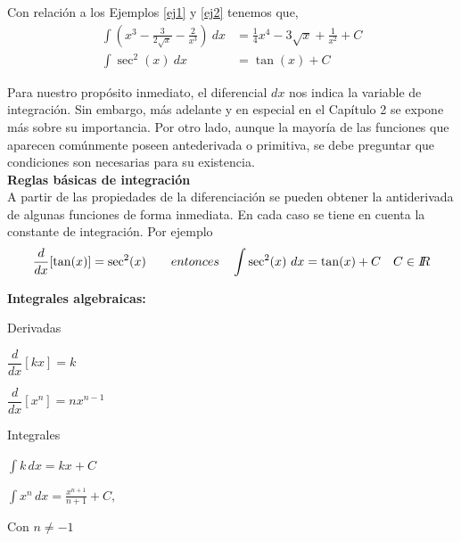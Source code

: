 \begin{Ejemplo} Con relaci\'on a los Ejemplos \ref{ej1} y \ref{ej2} tenemos que, 
\begin{align*}  
  \displaystyle\int \left( x^3-\frac{3}{2\sqrt{x}}-\frac{2}{x^3} \right) \ dx &= \frac{1}{4} x^{4}-3\sqrt{x}+\frac{1}{x^2} + C \\
   \displaystyle\int \sec^{2}(x) \ dx &= \tan(x)+C
\end{align*} 
\end{Ejemplo}

Para nuestro prop\'osito inmediato, el diferencial $dx$ nos indica la variable de integraci\'on. Sin embargo, m\'as adelante y en especial en el Cap\'itulo 2 se expone m\'as sobre su importancia. Por otro lado, aunque la mayor\'ia de las funciones que aparecen com\'unmente poseen antederivada o primitiva, se debe preguntar que condiciones son necesarias para su existencia.  \\


\noindent \textcolor{red!50!black}{\LARGE \bf  Reglas b\'asicas de integraci\'on}   \vspace*{10pt} \\
\noindent
A partir de las propiedades de la diferenciaci\'on se pueden obtener la antiderivada de algunas funciones de forma inmediata. En cada caso se tiene en cuenta la constante de integraci\'on. Por ejemplo
\begin{align*}
\frac{d}{dx}[\tan (x)]=\sec^{2}(x) \qquad entonces \quad \int \sec^{2}(x) \  dx= \tan (x) +C  \quad C\in I\!\! R
\end{align*}


\textbf{Integrales algebraicas:}
\begin{table}[h]
\begin{tcolorbox}[boxrule=0.2pt, enhanced,sharp corners, width=12cm,colframe=blue!8!black,colback=blue!5!white,drop lifted shadow=blue ]
\begin{multicols}{2}
\begin{list}{}{}
\item Derivadas
\item  $\dfrac{d}{dx}[kx] = k$
\item   $\dfrac{d}{dx}[x^{n}] = nx^{n-1}$
\columnbreak
\item Integrales
\item   $\displaystyle \int k\,dx=kx+C$
\item   $\displaystyle \int x^n\,dx=\frac{x^{n+1}}{n+1}+C,$ 
 \end{list}
 \end{multicols}
\hspace*{6.5cm} Con  $n\neq-1$
\end{tcolorbox}
\end{table}

